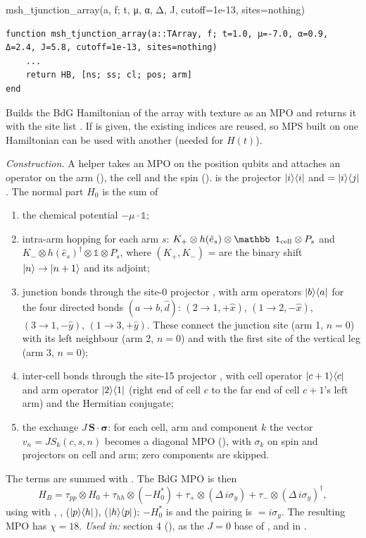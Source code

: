 \begin{function}{msh\_tjunction\_array(a, f; t, μ, α, Δ, J, cutoff=1e-13, sites=nothing)}
\begin{Verbatim}
function msh_tjunction_array(a::TArray, f; t=1.0, μ=-7.0, α=0.9, Δ=2.4, J=5.8, cutoff=1e-13, sites=nothing)
    ...
    return HB, [ns; ss; cl; pos; arm]
end
\end{Verbatim}
Builds the BdG Hamiltonian of the array with texture  as an MPO and returns it with the site list
. If  is given, the existing indices are reused, so MPS built on one Hamiltonian
can be used with another (needed for $H(t)$).

\emph{Construction.} A helper  takes an MPO on the position qubits and attaches an operator on the
arm (), the cell and the spin ().  is the projector $|i\rangle\langle i|$ and
 $= |i\rangle\langle j|$. The normal part $H_0$ is the sum of
\begin{enumerate}
\item the chemical potential $-\mu\cdot\mathbb 1$;
\item intra-arm hopping for each arm $s$: $K_+\otimes h(\hat e_s)\otimes\mathbb1_{\rm cell}\otimes P_s$ and
  $K_-\otimes h(\hat e_s)^\dagger\otimes\mathbb1\otimes P_s$, where $(K_+, K_-)$ =  are the
  binary shift $|n\rangle\to|n+1\rangle$ and its adjoint;
\item junction bonds through the site-0 projector , with arm operators $|b\rangle\langle a|$ for the
  four directed bonds $(a\to b, \hat d)$: $(2\to1, +\hat x)$, $(1\to2, -\hat x)$, $(3\to1, -\hat y)$, $(1\to3, +\hat y)$. These connect the
  junction site (arm 1, $n=0$) with its left neighbour (arm 2, $n=0$) and with the first site of the vertical leg (arm 3, $n=0$);
\item inter-cell bonds through the site-15 projector , with cell operator $|c+1\rangle\langle c|$ and arm operator $|2\rangle\langle1|$
  (right end of cell $c$ to the far end of cell $c+1$'s left arm) and the Hermitian conjugate;
\item the exchange $J\,\mathbf S\cdot\boldsymbol\sigma$: for each cell, arm and component $k$ the vector $v_n = JS_k(c,s,n)$ becomes a
  diagonal MPO (), with $\sigma_k$ on spin and projectors on cell and arm; zero components are skipped.
\end{enumerate}
The terms are summed with . The BdG MPO is then
\[
H_B = \tau_{pp}\otimes H_0 + \tau_{hh}\otimes(-H_0^*) + \tau_+\otimes(\Delta\,i\sigma_y) + \tau_-\otimes(\Delta\,i\sigma_y)^\dagger,
\]
using  with , ,  ($|p\rangle\langle h|$),  ($|h\rangle\langle p|$); $-H_0^*$ is
 and the pairing is  $= i\sigma_y$. The resulting MPO has $\chi = 18$.
\emph{Used in:} section 4 (), as the $J=0$ base of , and in .
\end{function}


